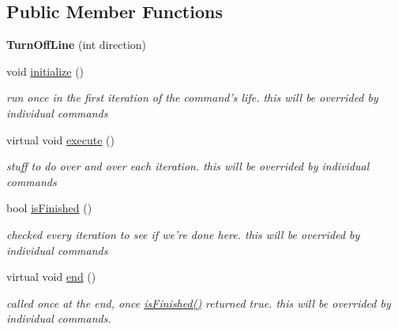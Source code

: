 \subsection*{Public Member Functions}
\begin{DoxyCompactItemize}
\item 
\hypertarget{classTurnOffLine_a646faf11da687b4ed4330c6248b6e99e}{{\bfseries Turn\-Off\-Line} (int direction)}\label{classTurnOffLine_a646faf11da687b4ed4330c6248b6e99e}

\item 
\hypertarget{classTurnOffLine_a4072817ff86f237d276a430e56e912a3}{void \hyperlink{classTurnOffLine_a4072817ff86f237d276a430e56e912a3}{initialize} ()}\label{classTurnOffLine_a4072817ff86f237d276a430e56e912a3}

\begin{DoxyCompactList}\small\item\em run once in the first iteration of the command's life. this will be overrided by individual commands \end{DoxyCompactList}\item 
\hypertarget{classTurnOffLine_a9897de245832cd3ee74edc35b342fc03}{virtual void \hyperlink{classTurnOffLine_a9897de245832cd3ee74edc35b342fc03}{execute} ()}\label{classTurnOffLine_a9897de245832cd3ee74edc35b342fc03}

\begin{DoxyCompactList}\small\item\em stuff to do over and over each iteration. this will be overrided by individual commands \end{DoxyCompactList}\item 
bool \hyperlink{classTurnOffLine_ad924499a6bc07a7331222e9b4aba3517}{is\-Finished} ()
\begin{DoxyCompactList}\small\item\em checked every iteration to see if we're done here. this will be overrided by individual commands \end{DoxyCompactList}\item 
\hypertarget{classTurnOffLine_ad888d865fb75e8139825f4dcf7709f1e}{virtual void \hyperlink{classTurnOffLine_ad888d865fb75e8139825f4dcf7709f1e}{end} ()}\label{classTurnOffLine_ad888d865fb75e8139825f4dcf7709f1e}

\begin{DoxyCompactList}\small\item\em called once at the end, once \hyperlink{classTurnOffLine_ad924499a6bc07a7331222e9b4aba3517}{is\-Finished()} returned true. this will be overrided by individual commands. \end{DoxyCompactList}\end{DoxyCompactItemize}
